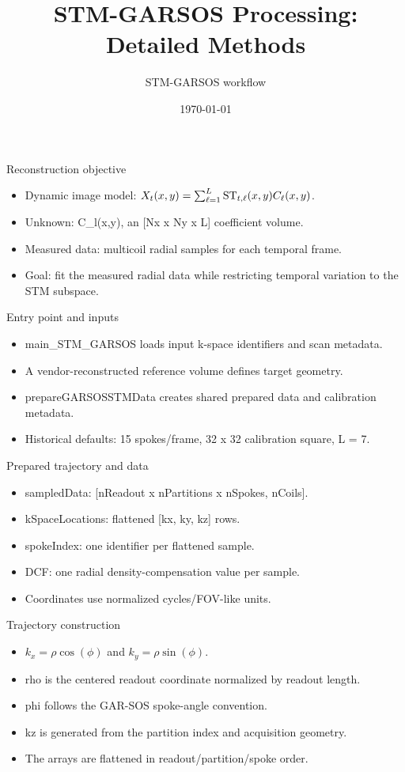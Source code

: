 \documentclass[aspectratio=169,professionalfonts]{beamer}
\title{STM-GARSOS Processing: Detailed Methods}
\author{STM-GARSOS workflow}
\date{\today}
\begin{document}
\begin{frame}\titlepage\end{frame}
\begin{frame}{Reconstruction objective}
\begin{itemize}
\item Dynamic image model: $X_t(x,y)=\sum_{\ell=1}^{L}{\rm ST}_{t,\ell}(x,y)C_\ell(x,y)$.
\item Unknown: C\_l(x,y), an [Nx x Ny x L] coefficient volume.
\item Measured data: multicoil radial samples for each temporal frame.
\item Goal: fit the measured radial data while restricting temporal variation to the STM subspace.
\end{itemize}
\end{frame}
\begin{frame}{Entry point and inputs}
\begin{itemize}
\item main\_STM\_GARSOS loads input k-space identifiers and scan metadata.
\item A vendor-reconstructed reference volume defines target geometry.
\item prepareGARSOSSTMData creates shared prepared data and calibration metadata.
\item Historical defaults: 15 spokes/frame, 32 x 32 calibration square, L = 7.
\end{itemize}
\end{frame}
\begin{frame}{Prepared trajectory and data}
\begin{itemize}
\item sampledData: [nReadout x nPartitions x nSpokes, nCoils].
\item kSpaceLocations: flattened [kx, ky, kz] rows.
\item spokeIndex: one identifier per flattened sample.
\item DCF: one radial density-compensation value per sample.
\item Coordinates use normalized cycles/FOV-like units.
\end{itemize}
\end{frame}
\begin{frame}{Trajectory construction}
\begin{itemize}
\item $k_x=\rho\cos(\phi)$ and $k_y=\rho\sin(\phi)$.
\item rho is the centered readout coordinate normalized by readout length.
\item phi follows the GAR-SOS spoke-angle convention.
\item kz is generated from the partition index and acquisition geometry.
\item The arrays are flattened in readout/partition/spoke order.
\end{itemize}
\end{frame}
\end{document}
